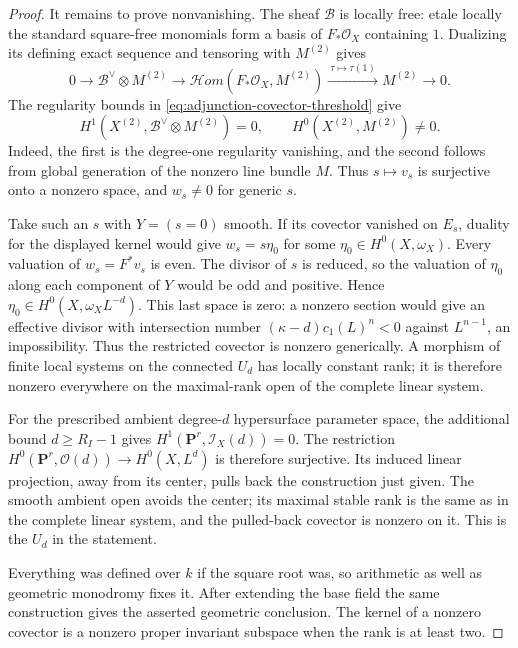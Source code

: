 \begin{proof}
It remains to prove nonvanishing.  The sheaf $\mathcal B$ is
locally free: etale locally the standard square-free
monomials form a basis of $F_*\mathcal O_X$ containing $1$.
Dualizing its defining exact sequence and tensoring with
$M^{(2)}$ gives
\[
 0\longrightarrow\mathcal B^\vee\otimes M^{(2)}
 \longrightarrow\mathcal Hom(F_*\mathcal O_X,M^{(2)})
 \xrightarrow{\ \tau\mapsto\tau(1)\ } M^{(2)}
 \longrightarrow0.
\]
The regularity bounds in
\eqref{eq:adjunction-covector-threshold} give
\[
 H^1(X^{(2)},\mathcal B^\vee\otimes M^{(2)})=0,
       \qquad H^0(X^{(2)},M^{(2)})\ne0.
\]
Indeed, the first is the degree-one regularity vanishing,
and the second follows from global generation of the
nonzero line bundle $M$.  Thus $s\mapsto v_s$ is surjective
onto a nonzero space, and $w_s\ne0$ for generic $s$.

Take such an $s$ with $Y=(s=0)$ smooth.  If its covector
vanished on $E_s$, duality for the displayed kernel would
give $w_s=s\eta_0$ for some $\eta_0\in H^0(X,\omega_X)$.
Every valuation of $w_s=F^*v_s$ is even.  The divisor of
$s$ is reduced, so the valuation of $\eta_0$ along each
component of $Y$ would be odd and positive.  Hence
$\eta_0\in H^0(X,\omega_X L^{-d})$.  This last space is zero:
a nonzero section would give an effective divisor with
intersection number $(\kappa-d)c_1(L)^n<0$ against
$L^{n-1}$, an impossibility.  Thus the restricted covector
is nonzero generically.  A morphism of finite local
systems on the connected $U_d$ has locally constant rank;
it is therefore nonzero everywhere on the maximal-rank open
of the complete linear system.

For the prescribed ambient degree-$d$ hypersurface parameter
space, the additional bound $d\geq R_I-1$ gives
$H^1(\mathbf P^r,\mathcal I_X(d))=0$.  The restriction
$H^0(\mathbf P^r,\mathcal O(d))\to H^0(X,L^d)$ is therefore
surjective.  Its induced linear projection, away from its
center, pulls back the construction just given.  The smooth
ambient open avoids the center; its maximal stable rank is
the same as in the complete linear system, and the pulled-back
covector is nonzero on it.  This is the $U_d$ in the statement.

Everything was defined over $k$ if the square root was,
so arithmetic as well as geometric monodromy fixes it.
After extending the base field the same construction
gives the asserted geometric conclusion.  The kernel
of a nonzero covector is a nonzero proper invariant
subspace when the rank is at least two.
\end{proof}

